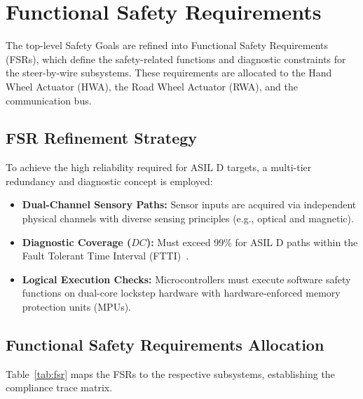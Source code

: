 \section{Functional Safety Requirements}
\label{sec:requirements}

The top-level Safety Goals are refined into Functional Safety Requirements (FSRs), which define the safety-related functions and diagnostic constraints for the steer-by-wire subsystems. These requirements are allocated to the Hand Wheel Actuator (HWA), the Road Wheel Actuator (RWA), and the communication bus.

\subsection{FSR Refinement Strategy}
To achieve the high reliability required for ASIL D targets, a multi-tier redundancy and diagnostic concept is employed:
\begin{itemize}
    \item \textbf{Dual-Channel Sensory Paths:} Sensor inputs are acquired via independent physical channels with diverse sensing principles (e.g., optical and magnetic).
    \item \textbf{Diagnostic Coverage ($DC$):} Must exceed 99\% for ASIL D paths within the Fault Tolerant Time Interval (FTTI)~\cite{Smith2020}.
    \item \textbf{Logical Execution Checks:} Microcontrollers must execute software safety functions on dual-core lockstep hardware with hardware-enforced memory protection units (MPUs).
\end{itemize}

\subsection{Functional Safety Requirements Allocation}
Table~\ref{tab:fsr} maps the FSRs to the respective subsystems, establishing the compliance trace matrix.

